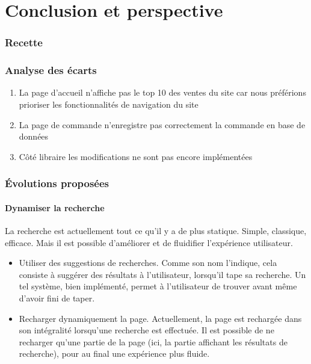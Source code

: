 \part{Conclusion et perspective}
\section{Recette}

\section{Analyse des écarts}
\begin{enumerate}
	\item La page d'accueil n'affiche pas le top 10 des ventes du site car nous préférions prioriser les fonctionnalités de navigation du site
	\item La page de commande n'enregistre pas correctement la commande en base de données
	\item Côté libraire les modifications ne sont pas encore implémentées
\end{enumerate}
\section{Évolutions proposées}

	\subsection{Dynamiser la recherche}

	La recherche est actuellement tout ce qu'il y a de plus statique. Simple, classique, efficace. Mais il est possible d'améliorer et de fluidifier l'expérience utilisateur.

	\begin{itemize}
		\item Utiliser des suggestions de recherches. Comme son nom l'indique, cela consiste à suggérer des résultats à l'utilisateur, lorsqu'il tape sa recherche. Un tel système, bien implémenté, permet à l'utilisateur de trouver avant même d'avoir fini de taper.
		\item Recharger dynamiquement la page. Actuellement, la page est rechargée dans son intégralité lorsqu'une recherche est effectuée. Il est possible de ne recharger qu'une partie de la page (ici, la partie affichant les résultats de recherche), pour au final une expérience plus fluide.
	\end{itemize}

